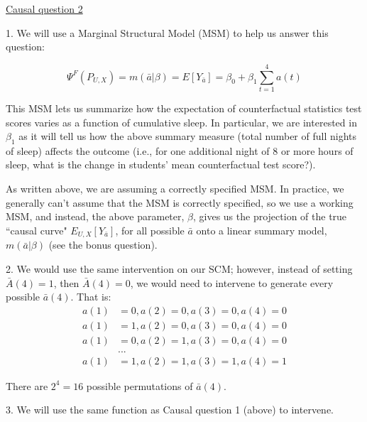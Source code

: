 \documentclass[answers]{exam}
\begin{document}
\begin{solution}
\noindent\underline{Causal question 2}


1. We will use a Marginal Structural Model (MSM) to help us answer this question:

\[
\Psi^F(P_{U,X}) = m(\bar{a}|\beta) = E[Y_{\bar{a}}] = \beta_0 + \beta_1 \sum_{t=1}^4a(t)
\]

This MSM lets us summarize how the expectation of counterfactual statistics test scores varies as a function of cumulative sleep. In particular, we are interested in $\beta_1$ as it will tell us how the above summary measure (total number of full nights of sleep) affects the outcome (i.e., for one additional night of 8 or more hours of sleep, what is the change in students' mean counterfactual test score?).

As written above, we are assuming a correctly specified MSM. In practice, we generally can't assume that the MSM is correctly specified, so we use a working MSM, and instead, the above parameter, $\beta$, gives us the projection of the true ``causal curve" $E_{U,X}[Y_{\bar{a}}]$, for all possible $\bar{a}$ onto a linear summary model, $m(\bar{a}|\beta)$ (see the bonus question).

2. We would use the same intervention on our SCM; however, instead of setting $\bar{A}(4) = 1$, then $\bar{A}(4)=0$, we would need to intervene to generate every possible $\bar{a}(4)$. That is:
\begin{align*}
a(1) & = 0, a(2) = 0, a(3) = 0, a(4) = 0 \\
a(1) & = 1, a(2) = 0, a(3) = 0, a(4) = 0 \\
a(1) & = 0, a(2) = 1, a(3) = 0, a(4) = 0 \\
& ... \\
a(1) & = 1, a(2) = 1, a(3) = 1, a(4) = 1
\end{align*}

There are $2^{4} = 16$ possible permutations of $\bar{a}(4)$.


3. We will use the same function as Causal question 1 (above) to intervene.


\end{solution}
\end{document}
